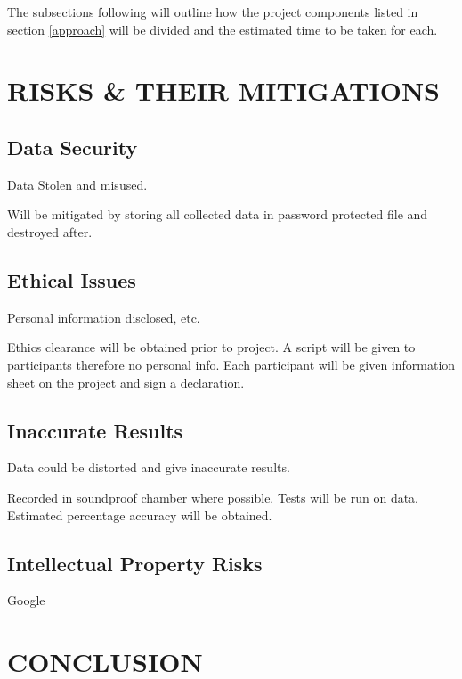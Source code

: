 \documentclass[10pt,twocolumn]{witseiepaper}
\begin{document}
The subsections following will outline how the project components listed in section \ref{approach} will be divided and the estimated time to be taken for each.

\section{RISKS \& THEIR MITIGATIONS} %
\subsection{Data Security}
Data Stolen and misused.

Will be mitigated by storing all collected data in password protected file and destroyed after.

\subsection{Ethical Issues}
Personal information disclosed, etc.

Ethics clearance will be obtained prior to project. A script will be given to participants therefore no personal info. Each participant will be given information sheet on the project and sign a declaration.

\subsection{Inaccurate Results}
Data could be distorted and give inaccurate results.

Recorded in soundproof chamber where possible. Tests will be run on data. Estimated percentage accuracy will be obtained.

\subsection{Intellectual Property Risks}
Google
\section{CONCLUSION} %


%
%
%

\newpage
\onecolumn

\begin{appendix}

\end{appendix} 	

\end{document}

